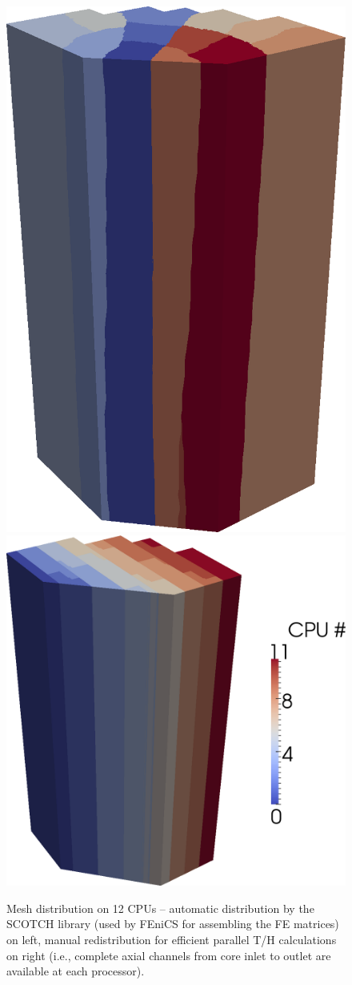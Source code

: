 \begin{figure}[!ht]
\centering
  \includegraphics[width=.335\textwidth]{mox/rank-ass}\hspace{2em}
  \includegraphics[width=.5\textwidth]{mox/rank-th}
  \caption[Parallel mesh distribution in the OECD/NEA MOX-UO2 benchmark]{Mesh distribution on 12 CPUs -- automatic
  distribution by the SCOTCH library (used by FEniCS for assembling the FE matrices) on left, manual redistribution
  for efficient parallel T/H calculations on right (i.e., complete axial channels from core inlet to outlet are
  available at each processor).}
  \label{fig:mox2}
\end{figure}



